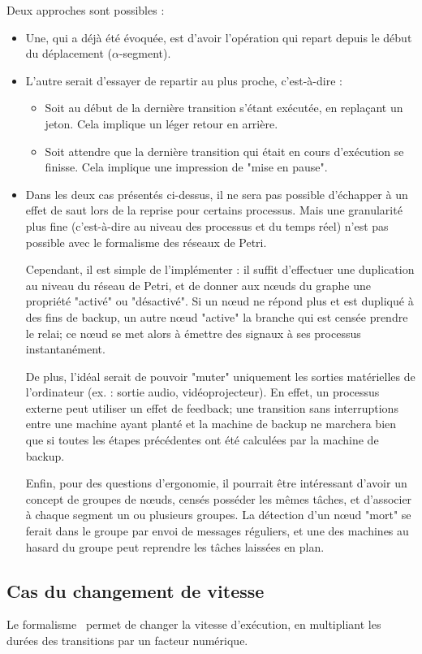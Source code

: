 Deux approches sont possibles :
\begin{itemize}
\item Une, qui a déjà été évoquée, est d'avoir l'opération qui repart depuis le début du déplacement ($\alpha$-segment).
\item L'autre serait d'essayer de repartir au plus proche, c'est-à-dire :  
\begin{itemize}
\item Soit au début de la dernière transition s'étant exécutée, en replaçant un jeton. Cela implique un léger retour en arrière.
\item Soit attendre que la dernière transition qui était en cours d'exécution se finisse. Cela implique une impression de "mise en pause".
\end{itemize}

\item Dans les deux cas présentés ci-dessus, il ne sera pas possible d'échapper à un effet de saut lors de la reprise pour certains processus. Mais une granularité plus fine (c'est-à-dire au niveau des processus et du temps réel) n'est pas possible avec le formalisme des réseaux de Petri.

Cependant, il est simple de l'implémenter : il suffit d'effectuer une duplication au niveau du réseau de Petri, et de donner aux nœuds du graphe une propriété "activé" ou "désactivé". Si un nœud ne répond plus et est dupliqué à des fins de backup, un autre nœud "active" la branche qui est censée prendre le relai; ce nœud se met alors à émettre des signaux à ses processus instantanément.

De plus, l'idéal serait de pouvoir "muter" uniquement les sorties matérielles de l'ordinateur (ex. : sortie audio, vidéoprojecteur). En effet, un processus externe peut utiliser un effet de feedback; une transition sans interruptions entre une machine ayant planté et la machine de backup ne marchera bien que si toutes les étapes précédentes ont été calculées par la machine de backup.

Enfin, pour des questions d'ergonomie, il pourrait être intéressant d'avoir un concept de groupes de nœuds, censés posséder les mêmes tâches, et d'associer à chaque segment un ou plusieurs groupes. La détection d'un nœud "mort" se ferait dans le groupe par envoi de messages réguliers, et une des machines au hasard du groupe peut reprendre les tâches laissées en plan.
\end{itemize}

\subsection{Cas du changement de vitesse}
Le formalisme~\cite{allombert2010virage} permet de changer la vitesse d'exécution, en multipliant les durées des transitions par un facteur numérique.

